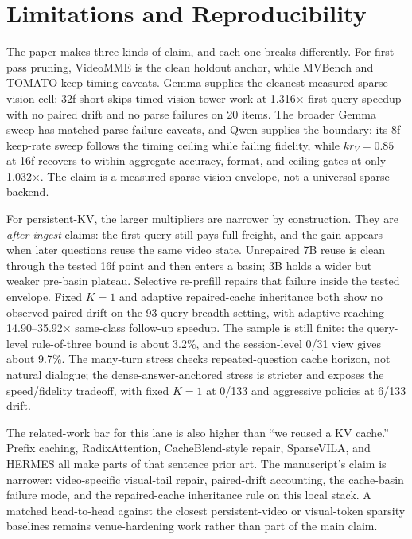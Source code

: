 \section{Limitations and Reproducibility}

The paper makes three kinds of claim, and each one breaks differently. For
first-pass pruning, VideoMME is the clean holdout anchor, while MVBench and
TOMATO keep timing caveats. Gemma supplies the cleanest measured sparse-vision
cell: 32f short skips timed vision-tower work at 1.316$\times$ first-query
speedup with no paired drift and no parse failures on 20 items. The broader
Gemma sweep has matched parse-failure caveats, and Qwen supplies the boundary:
its 8f keep-rate sweep follows the timing ceiling while failing fidelity, while
\(kr_V=0.85\) at 16f recovers to within aggregate-accuracy, format, and ceiling
gates at only 1.032$\times$. The claim is a measured sparse-vision envelope,
not a universal sparse backend.

For persistent-KV, the larger multipliers are narrower by construction. They
are \emph{after-ingest} claims: the first query still pays full freight, and
the gain appears when later questions reuse the same video state. Unrepaired 7B
reuse is clean through the tested 16f point and then enters a basin; 3B holds a
wider but weaker pre-basin plateau. Selective re-prefill repairs that failure
inside the tested envelope. Fixed \(K=1\) and adaptive repaired-cache
inheritance both show no observed paired drift on the 93-query breadth setting,
with adaptive reaching 14.90--35.92$\times$ same-class follow-up speedup. The
sample is still finite: the query-level rule-of-three bound is about 3.2\%,
and the session-level 0/31 view gives about 9.7\%. The many-turn stress checks
repeated-question cache horizon, not natural dialogue; the dense-answer-anchored
stress is stricter and exposes the speed/fidelity tradeoff, with fixed \(K=1\)
at 0/133 and aggressive policies at 6/133 drift.



The related-work bar for this lane is also higher than ``we reused a KV
cache.'' Prefix caching, RadixAttention, CacheBlend-style repair, SparseVILA,
and HERMES all make parts of that sentence prior art. The manuscript's
claim is narrower: video-specific visual-tail repair, paired-drift accounting,
the cache-basin failure mode, and the repaired-cache inheritance rule on this
local stack. A matched head-to-head against the closest persistent-video or
visual-token sparsity baselines remains venue-hardening work rather than part
of the main claim.

